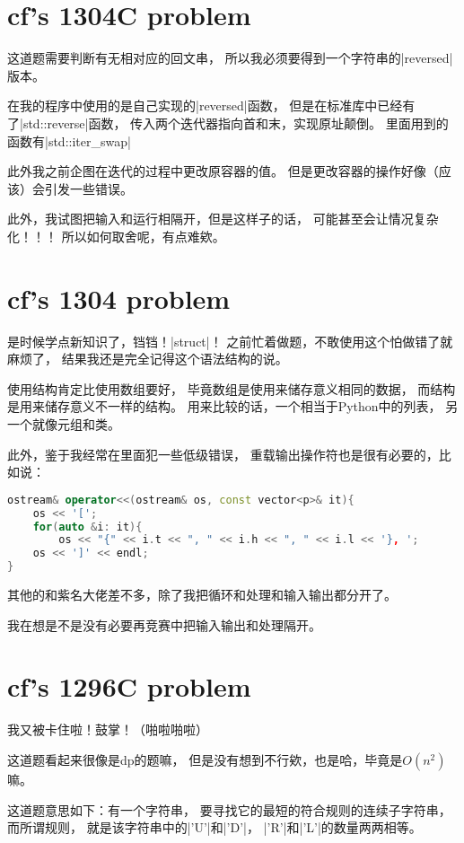 \section{cf's 1304C problem}

这道题需要判断有无相对应的回文串，
所以我必须要得到一个字符串的\vb|reversed|版本。

在我的程序中使用的是自己实现的\vb|reversed|函数，
但是在标准库中已经有了\vb|std::reverse|函数，
传入两个迭代器指向首和末，实现原址颠倒。
里面用到的函数有\vb|std::iter_swap|

此外我之前企图在迭代的过程中更改原容器的值。
但是更改容器的操作好像（应该）会引发一些错误。

此外，我试图把输入和运行相隔开，但是这样子的话，
可能甚至会让情况复杂化！！！
所以如何取舍呢，有点难欸。


\section{cf's 1304 problem}

是时候学点新知识了，铛铛！\vb|struct|！
之前忙着做题，不敢使用这个怕做错了就麻烦了，
结果我还是完全记得这个语法结构的说。

使用结构肯定比使用数组要好，
毕竟数组是使用来储存意义相同的数据，
而结构是用来储存意义不一样的结构。
用来比较的话，一个相当于Python中的列表，
另一个就像元组和类。

此外，鉴于我经常在里面犯一些低级错误，
重载输出操作符也是很有必要的，比如说：
\begin{lstlisting}[language=C++]
ostream& operator<<(ostream& os, const vector<p>& it){
    os << '[';
    for(auto &i: it){
        os << "{" << i.t << ", " << i.h << ", " << i.l << '}, ';
    os << ']' << endl;
}
\end{lstlisting}

其他的和紫名大佬差不多，除了我把循环和处理和输入输出都分开了。

我在想是不是没有必要再竞赛中把输入输出和处理隔开。


\section{cf's 1296C problem}

我又被卡住啦！鼓掌！（啪啦啪啦）

这道题看起来很像是dp的题嘛，
但是没有想到不行欸，也是哈，毕竟是$O(n^2)$嘛。

这道题意思如下：有一个字符串，
要寻找它的最短的符合规则的连续子字符串，
而所谓规则，
就是该字符串中的\vb|'U'|和\vb|'D'|，
\vb|'R'|和\vb|'L'|的数量两两相等。

